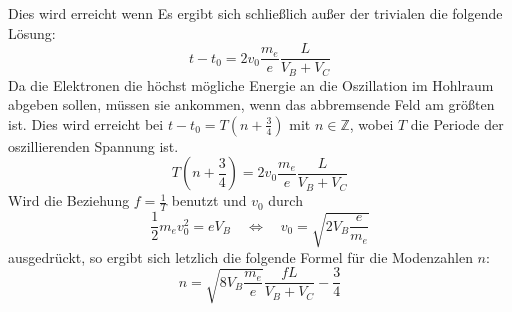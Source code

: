         Dies wird erreicht wenn 
        Es ergibt sich schließlich außer der trivialen die folgende Lösung:
        \begin{equation*}
            t - t_0 = 2 v_0 \frac{m_e}{e} \frac{L}{V_B + V_C}
        \end{equation*}
        Da die Elektronen die höchst mögliche Energie an die Oszillation im Hohlraum abgeben sollen, müssen sie ankommen, wenn das abbremsende Feld am größten ist.
        Dies wird erreicht bei $t - t_0 = T (n + \frac{3}{4})$ mit $n \in \mathbb{Z}$, wobei $T$ die Periode der oszillierenden Spannung ist.
        \begin{equation*}
            T \left(n + \frac{3}{4} \right) = 2 v_0 \frac{m_e}{e} \frac{L}{V_B + V_C}
        \end{equation*}
        Wird die Beziehung $f = \frac{1}{T}$ benutzt und $v_0$ durch
        \begin{equation*}
            \frac{1}{2} m_e v_0^2 = e V_B \quad \Leftrightarrow \quad v_0 = \sqrt{2 V_B \frac{e}{m_e}}
        \end{equation*}
        ausgedrückt, so ergibt sich letzlich die folgende Formel für die Modenzahlen $n$:
        \begin{equation}
            \label{eqn:moden}
            n = \sqrt{8 V_B \frac{m_e}{e}} \frac{f L}{V_B + V_C} - \frac{3}{4}
        \end{equation}

    \newpage
